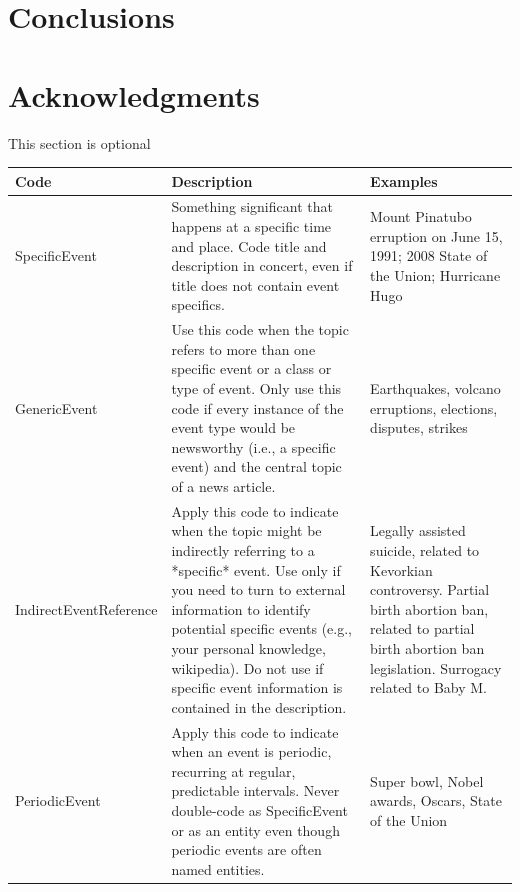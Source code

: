\documentclass{sig-alternate}
\begin{document}
\section{Conclusions}


\section{Acknowledgments}
This section is optional

%



  

\appendix


\begin{table}[H]
\small
\begin{tabular}{| l | p{7cm}  | p{7cm}  |} \hline
\bf{Code} & \bf{Description} & \bf{Examples}  \\ \hline
SpecificEvent & Something significant that happens at a specific time and place. Code title and description in concert, even if title does not contain event specifics. & Mount Pinatubo erruption on June 15, 1991; 2008 State of the Union; Hurricane Hugo \\ \hline
GenericEvent & Use this code when the topic refers to more than one specific event or a class or type of event. Only use this code if every instance of the event type would be newsworthy (i.e., a specific event) and the central topic of a news article. & Earthquakes, volcano erruptions, elections, disputes, strikes \\ \hline
IndirectEventReference & Apply this code to indicate when the topic might be indirectly referring to a *specific* event. Use only if you need to turn to external information to identify potential specific events (e.g., your personal knowledge, wikipedia). Do not use if specific event information is contained in the description. & Legally assisted suicide, related to Kevorkian controversy. Partial birth abortion ban, related to partial birth abortion ban legislation. Surrogacy related to Baby M. \\ \hline
PeriodicEvent & Apply this code to indicate when an event is periodic, recurring at regular, predictable intervals. Never double-code as SpecificEvent or as an entity even though periodic events are often named entities. & Super bowl, Nobel awards, Oscars, State of the Union \\ \hline

\end{tabular}
\end{table}
\end{document}
